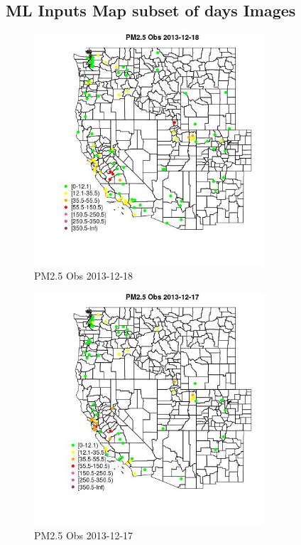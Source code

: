 
\subsection{ML Inputs Map subset of days Images} 
 

\begin{figure} 
\centering  
\includegraphics[width=0.77\textwidth]{Code_Outputs/Report_ML_input_PM25_Step4_part_e_de_duplicated_aves_MapObsPM25_Obs2013-12-18.jpg} 
\caption{\label{fig:Report_ML_input_PM25_Step4_part_e_de_duplicated_avesMapObsPM25_Obs2013-12-18}PM2.5 Obs 2013-12-18} 
\end{figure} 
 

\begin{figure} 
\centering  
\includegraphics[width=0.77\textwidth]{Code_Outputs/Report_ML_input_PM25_Step4_part_e_de_duplicated_aves_MapObsPM25_Obs2013-12-17.jpg} 
\caption{\label{fig:Report_ML_input_PM25_Step4_part_e_de_duplicated_avesMapObsPM25_Obs2013-12-17}PM2.5 Obs 2013-12-17} 
\end{figure} 
 

